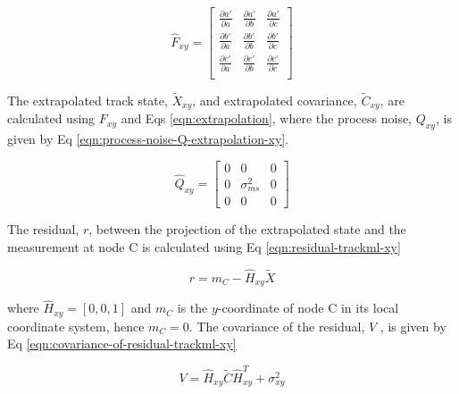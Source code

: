 

\begin{equation}
\hat{F}_{xy} = \begin{bmatrix} 
        \frac{\partial a'}{\partial a} & \frac{\partial a'}{\partial b} & \frac{\partial a'}{\partial c} \\ 
        
        \frac{\partial b'}{\partial a} & \frac{\partial b'}{\partial b} & \frac{\partial b'}{\partial c} \\
        
        \frac{\partial c'}{\partial a} & \frac{\partial c'}{\partial b} & \frac{\partial c'}{\partial c} \\
        \end{bmatrix} 
\label{eqn:transition-jacobian-F-kf-extrapolation-xy}
\end{equation}


The extrapolated track state, $\tilde{X}_{xy}$, and extrapolated covariance, $\tilde{C}_{xy}$, are calculated using $F_{xy}$ and Eqs \eqref{eqn:extrapolation}, where the process noise, $Q_{xy}$, is given by Eq \eqref{eqn:process-noise-Q-extrapolation-xy}.

\begin{equation}
\hat{Q}_{xy} = \begin{bmatrix} 
                0 & 0 & 0 \\ 
                0 & \sigma_{ms}^2 & 0 \\
                0 & 0 & 0 \end{bmatrix} 
\label{eqn:process-noise-Q-extrapolation-xy}
\end{equation}

The residual, $r$, between the projection of the extrapolated state and the measurement at node C is calculated using Eq \eqref{eqn:residual-trackml-xy}

\begin{equation}
r = m_C - \hat{H}_{xy} \tilde{X}
\label{eqn:residual-trackml-xy}
\end{equation}

where $\hat{H}_{xy} = [0, 0, 1]$ and $m_C$ is the $y$-coordinate of node C in its local coordinate system, hence $m_C = 0$. The covariance of the residual, $V$ , is given by Eq \eqref{eqn:covariance-of-residual-trackml-xy}

\begin{equation}
{V} = \hat{H}_{xy} \widetilde{C} \hat{H}^{T}_{xy} + \sigma_{xy}^{2}
\label{eqn:covariance-of-residual-trackml-xy}
\end{equation}

